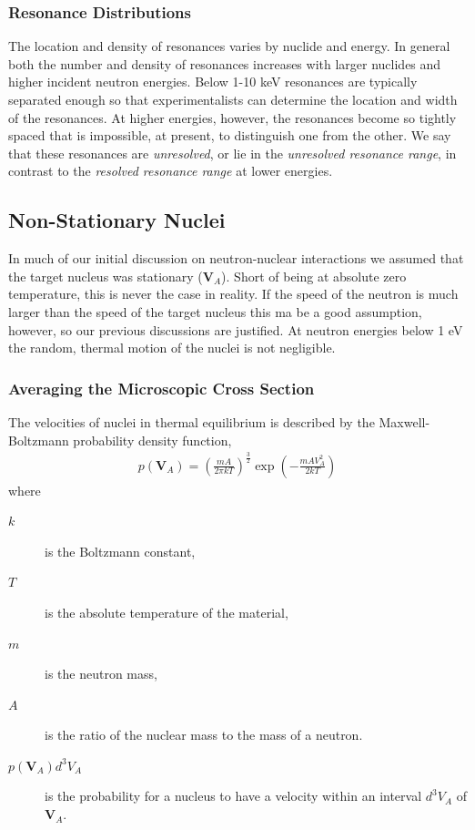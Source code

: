 \documentclass[11pt]{article}
\renewcommand\vec{\mathbf}
\begin{document}
\subsubsection{Resonance Distributions}
\label{sec:orgheadline16}
The location and density of resonances varies by nuclide and energy.  In general both the number and density of resonances increases with larger nuclides and higher incident neutron energies.  Below 1-10 keV resonances are typically separated enough so that experimentalists can determine the location and width of the resonances. At higher energies, however, the resonances become so tightly spaced that is impossible, at present, to distinguish one from the other.  We say that these resonances are \emph{unresolved}, or lie in the \emph{unresolved resonance range}, in contrast to the \emph{resolved resonance range} at lower energies.
\subsection{Non-Stationary Nuclei}
\label{sec:orgheadline21}
In much of our initial discussion on neutron-nuclear interactions we assumed that the target nucleus was stationary (\(\vec{V}_A\)).  Short of being at absolute zero temperature, this is never the case in reality.  If the speed of the neutron is much larger than the speed of the target nucleus this ma be a good assumption, however, so our previous discussions are justified.  At neutron energies below 1 eV the random, thermal motion of the nuclei is not negligible.

\subsubsection{Averaging the Microscopic Cross Section}
\label{sec:orgheadline18}
The velocities of nuclei in thermal equilibrium is described by the Maxwell-Boltzmann probability density function,
\begin{align}
  p(\vec{V}_A) = \left( \frac{mA}{2\pi k T} \right)^\frac{3}{2} \exp\left(-\frac{mAV_A^2}{2kT}\right) 
\end{align}
where
\begin{description}
\item[{\(k\)}] is the Boltzmann constant,
\item[{\(T\)}] is the absolute temperature of the material,
\item[{\(m\)}] is the neutron mass,
\item[{\(A\)}] is the ratio of the nuclear mass to the mass of a neutron.
\item[{\(p(\vec{V}_A)d^3V_A\)}] is the probability for a nucleus to have a velocity within an interval \(d^3V_A\) of \(\vec{V}_A\).
\end{description}
\end{document}
